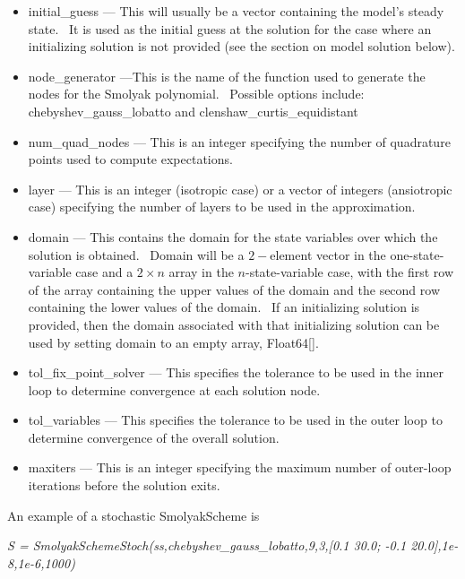 \documentclass[notitlepage,11pt]{article}
\begin{document}
\begin{itemize}
\item initial\_guess --- This will usually be a vector containing the
model's steady state. \ It is used as the initial guess at the solution for
the case where an initializing solution is not provided (see the section on
model solution below).

\item node\_generator ---This is the name of the function used to generate
the nodes for the Smolyak polynomial. \ Possible options include:
chebyshev\_gauss\_lobatto and clenshaw\_curtis\_equidistant

\item num\_quad\_nodes --- This is an integer specifying the number of
quadrature points used to compute expectations.

\item layer --- This is an integer (isotropic case) or a vector of integers
(ansiotropic case) specifying the number of layers to be used in the
approximation.

\item domain --- This contains the domain for the state variables over which
the solution is obtained. \ Domain will be a $2-$element vector in the
one-state-variable case and a $2\times n$ array in the $n$-state-variable
case, with the first row of the array containing the upper values of the
domain and the second row containing the lower values of the domain. \ If an
initializing solution is provided, then the domain associated with that
initializing solution can be used by setting domain to an empty array,
Float64[].

\item tol\_fix\_point\_solver --- This specifies the tolerance to be used in
the inner loop to determine convergence at each solution node.

\item tol\_variables --- This specifies the tolerance to be used in the
outer loop to determine convergence of the overall solution.

\item maxiters --- This is an integer specifying the maximum number of
outer-loop iterations before the solution exits.
\end{itemize}

\bigskip

An example of a stochastic SmolyakScheme is

\bigskip

\textit{S = SmolyakSchemeStoch(ss,chebyshev\_gauss\_lobatto,9,3,[0.1 30.0;
-0.1 20.0],1e-8,1e-6,1000)}
\end{document}
